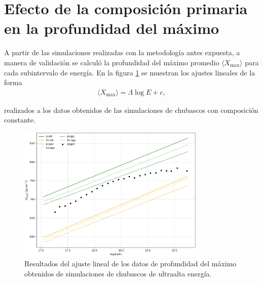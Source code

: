 %


\section{Efecto de la composición primaria en la profundidad del máximo}
A partir de las simulaciones realizadas con la metodología antes expuesta, a manera de validación se calculó la profundidad del máximo promedio $\langle X_{\text{max}} \rangle$ para cada subintervalo de energía. En la figura \ref{fig:xmax_pfe} se muestran los ajustes lineales de la forma
\begin{align}
\langle X_{\text{max}} \rangle = \Lambda \log E + c,
\end{align}

realizados a los datos obtenidos de las simulaciones de chubascos con composición constante.\\

\begin{figure}[]
\centering
\includegraphics[width=0.8\textwidth]{Figuras/Xmax_pFe_fit.png}
\caption{Resultados del ajuste lineal de los datos de profundidad del máximo obtenidos de simulaciones de chubascos de ultraalta energía.}
\label{fig:xmax_pfe}
\end{figure}

